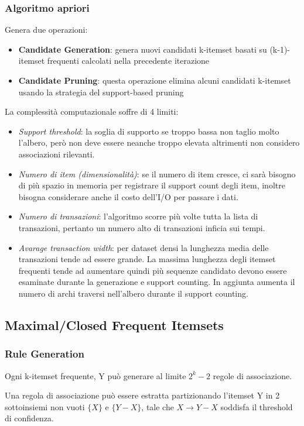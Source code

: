 \subsubsection{Algoritmo apriori}
Genera due operazioni:
\begin{itemize}
	\item \textbf{Candidate Generation}: genera nuovi candidati k-itemset basati su (k-1)-itemset frequenti calcolati nella precedente iterazione
	\item \textbf{Candidate Pruning}: questa operazione elimina alcuni candidati k-itemset usando la strategia del support-based pruning
\end{itemize}

La complessit\`a computazionale soffre di 4 limiti:
\begin{itemize}
	\item \textit{Support threshold}: la soglia di supporto se troppo bassa non taglio molto l'albero, però non deve essere neanche troppo elevata altrimenti non considero associazioni rilevanti. 
	\item \textit{Numero di item (dimensionalit\`a)}: se il numero di item cresce, ci sar\`a bisogno di più spazio in memoria per registrare il support count degli item, inoltre bisogna considerare anche il costo dell'I/O per passare i dati.
	\item \textit{Numero di transazioni}: l'algoritmo scorre più volte tutta la lista di transazioni, pertanto un numero alto di transazioni inficia sui tempi.
	\item \textit{Avarage transaction width}: per dataset densi la lunghezza media delle transazioni tende ad essere grande. La massima lunghezza degli itemset frequenti tende ad aumentare quindi più sequenze candidato devono essere esaminate durante la generazione e support counting. In aggiunta aumenta il numero di archi traversi nell'albero durante il support counting.
\end{itemize}

\subsection{Maximal/Closed Frequent Itemsets}
\subsubsection{Rule Generation}
Ogni k-itemset frequente, Y pu\`o generare al limite $2^k-2$ regole di associazione. 

Una regola di associazione pu\`o essere estratta partizionando l'itemset Y in 2 sottoinsiemi non vuoti $\{X\}$ e $\{Y-X\}$, tale che $X \rightarrow Y -X$ soddisfa il threshold di confidenza.

